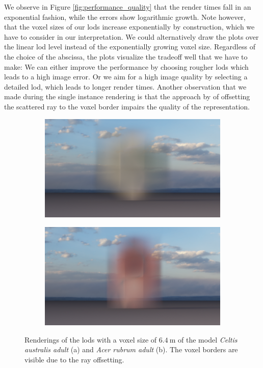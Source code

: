 We observe in Figure \ref{fig:performance_quality} that the render times fall in an exponential fashion, while the \FLIP errors show logarithmic growth.
Note however, that the voxel sizes of our \acsp{lod} increase exponentially by construction, which we have to consider in our interpretation.
We could alternatively draw the plots over the linear \ac{lod} level instead of the exponentially growing voxel size.
Regardless of the choice of the abscissa, the plots visualize the tradeoff well that we have to make: We can either improve the performance by choosing rougher \acsp{lod} which leads to a high image error.
Or we aim for a high image quality by selecting a detailed \ac{lod}, which leads to longer render times.
Another observation that we made during the single instance rendering is that the approach by \citeauthor{vicini2021non} of offsetting the scattered ray to the voxel border impairs the quality of the representation.
\begin{figure}[t]
    \centering
    \begin{subfigure}[b]{0.49\linewidth}
        \centering
        \includegraphics[width=1\linewidth]{img/results/EU06a_6.4.png}
        \caption{}
    \end{subfigure}
    \begin{subfigure}[b]{0.49\linewidth}
        \centering
        \includegraphics[width=1\linewidth]{img/results/EA01a_6.4.png}
        \caption{}
    \end{subfigure}
	\caption[Renderings of volumes with a voxel size of $\SI{6.4}{\m}$]{Renderings of the \acsp{lod} with a voxel size of $\SI{6.4}{\m}$ of the model \textit{Celtis australis adult} (a) and \textit{Acer rubrum adult} (b). The voxel borders are visible due to the ray offsetting.}
	\label{fig:rough_lods}
\end{figure}
